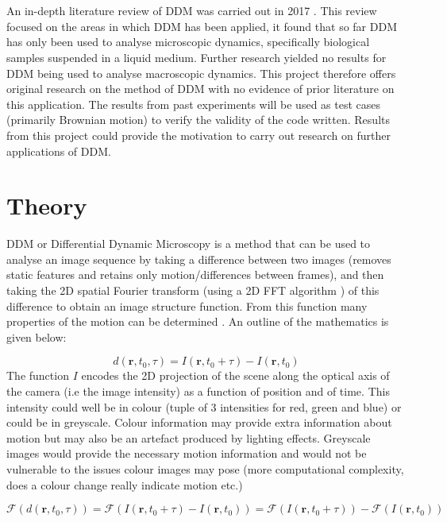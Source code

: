 \documentclass[11pt]{article}
\begin{document}
\\\\
An in-depth literature review of DDM was carried out in 2017 \cite{ddm1}. This review focused on the areas in which DDM has been applied, it found that so far DDM has only been used to analyse microscopic dynamics, specifically biological samples suspended in a liquid medium. Further research yielded no results for DDM being used to analyse macroscopic dynamics. This project therefore offers original research on the method of DDM with no evidence of prior literature on this application. The results from past experiments will be used as test cases (primarily Brownian motion) to verify the validity of the code written. Results from this project could provide the motivation to carry out research on further applications of DDM.

\clearpage
\section{Theory}

DDM or Differential Dynamic Microscopy is a method that can be used to analyse an image sequence by taking a difference between two images (removes static features and retains only motion/differences between frames), and then taking the 2D spatial Fourier transform (using a 2D FFT algorithm \cite{fft}) of this difference to obtain an image structure function.
From this function many properties of the motion can be determined \cite{ddm1}.
An outline of the mathematics is given below:

\begin{equation}
    d(\textbf{r}, t_0, \tau) = I(\mathbf{r}, t_0 + \tau) - I(\mathbf{r}, t_0)
\end{equation}
The function $\textit{I}$ encodes the 2D projection of the scene along the optical axis of the camera (i.e the image intensity) as a function of position and of time.
This intensity could well be in colour (tuple of 3 intensities for red, green and blue) or could be in greyscale. Colour information may provide extra information about motion but may also be an artefact produced by lighting effects. Greyscale images would provide the necessary motion information and would not be vulnerable to the issues colour images may pose (more computational complexity, does a colour change really indicate motion etc.)

\begin{equation}
    \mathscr{F} (d(\textbf{r}, t_0, \tau) ) = \mathscr{F} (I(\mathbf{r}, t_0 + \tau) - I(\mathbf{r}, t_0)) = \mathscr{F}(I(\mathbf{r}, t_0 + \tau)) - \mathscr{F}(I(\mathbf{r}, t_0))
\end{equation}
\end{document}
